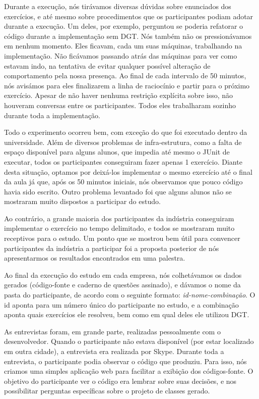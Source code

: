 Durante a execução, nós tirávamos diversas dúvidas sobre enunciados dos
exercícios, e até mesmo sobre procedimentos que os participantes podiam
adotar durante a execução. Um deles, por exemplo, perguntou se poderia
refatorar o código durante a implementação sem DGT. 
Nós também não os pressionávamos em nenhum momento. Eles ficavam,
cada um suas máquinas, trabalhando na implementação. Não ficávamos 
passando atrás das máquinas para ver como estavam indo, na tentativa
de evitar qualquer possível alteração de comportamento pela nossa presença.
Ao final de cada intervalo de 50 minutos, nós avisámos para eles finalizarem
a linha de raciocínio e partir para o próximo exercício.
Apesar de não haver nenhuma restrição explícita sobre isso, não houveram
conversas entre os participantes. Todos eles trabalharam sozinho
durante toda a implementação.

Todo o experimento ocorreu bem, com exceção do que foi executado
dentro da universidade. Além de diversos problemas de infra-estrutura,
como a falta de espaço disponível para alguns alunos, que impedia até mesmo
o JUnit de executar, todos os participantes conseguiram fazer apenas
1 exercício. Diante desta situação, optamos por deixá-los implementar
o mesmo exercício até o final da aula já que, após os 50 minutos iniciais,
nós observamos que pouco código havia sido escrito. Outro problema levantado
foi que alguns alunos não se mostraram muito dispostos a participar
do estudo.

Ao contrário, a grande maioria dos participantes da indústria conseguiram
implementar o exercício no tempo delimitado, e todos se mostraram
muito receptivos para o estudo. Um ponto que se mostrou bem útil
para convencer participantes da indústria a participar foi a proposta
posterior de nós apresentarmos os resultados encontrados em uma palestra.

Ao final da execução do estudo em cada empresa, nós colhetávamos
os dados gerados (código-fonte e caderno de questões assinado),
e dávamos o nome da pasta do participante, de acordo com
o seguinte formato: \textit{id-nome-combinação}. O id aponta
para um número único do participante no estudo, e a combinação
aponta quais exercícios ele resolveu, bem como em qual deles
ele utilizou DGT.

As entrevistas foram, em grande parte, realizadas pessoalmente com 
o desenvolvedor. Quando o participante não estava disponível (por estar
localizado em outra cidade), a entrevista era realizada por Skype.
Durante toda a entrevista, o participante podia observar o código que
produziu. Para isso, nós criamos uma simples aplicação web para facilitar
a exibição dos códigos-fonte. O objetivo do participante ver o código
era lembrar sobre suas decisões, e nos possibilitar perguntas específicas
sobre o projeto de classes gerado.

